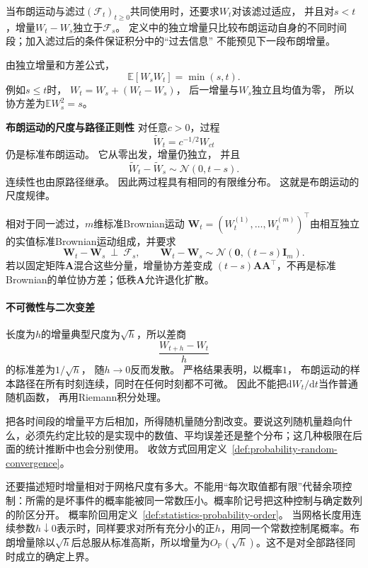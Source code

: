 当布朗运动与滤过$(\mathcal{F}_t)_{t\geq0}$共同使用时，还要求$W_t$对该滤过适应，
并且对$s<t$，增量$W_t-W_s$独立于$\mathcal{F}_s$。
定义中的独立增量只比较布朗运动自身的不同时间段；加入滤过后的条件保证积分中的“过去信息”
不能预见下一段布朗增量。

由独立增量和方差公式，
\begin{equation}
	\mathbb{E}[W_{s}W_{t}]=\min(s,t). \label{eq:dynamical-brownian-covariance}
\end{equation}
例如$s\leq t$时， $W_{t}=W_{s}+(W_{t}-W_{s})$， 后一增量与$W_{s}$独立且均值为零，
所以协方差为$\mathbb{E}W_{s}^{2}=s$。

\par\medskip\noindent\textbf{布朗运动的尺度与路径正则性}\quad
对任意$c>0$，过程
\[
	\widetilde W_{t}= c^{-1/2}W_{ct}
\]
仍是标准布朗运动。 它从零出发，增量仍独立， 并且
\[
	\widetilde W_{t}-\widetilde W_{s}\sim \mathcal{N}(0,t-s).
\]
连续性也由原路径继承。 因此两过程具有相同的有限维分布。
这就是布朗运动的尺度规律。

相对于同一滤过，\(m\)维标准Brownian运动
\(\bm W_t=(W_t^{(1)},\ldots,W_t^{(m)})^\top\)由相互独立的实值标准Brownian运动组成，并要求
\[
\bm W_t-\bm W_s\ \perp\ \mathcal F_s,\qquad
\bm W_t-\bm W_s\sim\mathcal N(\bm0,(t-s)\bm I_m).
\]
若以固定矩阵\(\bm A\)混合这些分量，增量协方差变成
\((t-s)\bm A\bm A^\top\)，不再是标准Brownian的单位协方差；低秩\(\bm A\)允许退化扩散。

\paragraph{不可微性与二次变差}
长度为\(h\)的增量典型尺度为\(\sqrt h\)，所以差商
\[
	\frac{W_{t+h}-W_{t}}{h}
\]
的标准差为$1/\sqrt{h}$， 随$h\to0$反而发散。 严格结果表明，以概率$1$，
布朗运动的样本路径在所有时刻连续，同时在任何时刻都不可微。
因此不能把$\mathrm{d}W_{t}/\mathrm{d}t$当作普通随机函数， 再用Riemann积分处理。

把各时间段的增量平方后相加，所得随机量随分割改变。要说这列随机量趋向什么，必须先约定比较的是实现中的数值、平均误差还是整个分布；这几种极限在后面的统计推断中也会分别使用。
收敛方式回用定义~\ref{def:probability-random-convergence}。

还要描述短时增量相对于网格尺度有多大。不能用“每次取值都有限”代替余项控制：所需的是坏事件的概率能被同一常数压小。概率阶记号把这种控制与确定数列的阶区分开。
概率阶回用定义~\ref{def:statistics-probability-order}。
当网格长度用连续参数\(h\downarrow0\)表示时，同样要求对所有充分小的正\(h\)，用同一个常数控制尾概率。布朗增量除以\(\sqrt h\)后总服从标准高斯，所以增量为\(O_{\mathbb P}(\sqrt h)\)。这不是对全部路径同时成立的确定上界。

